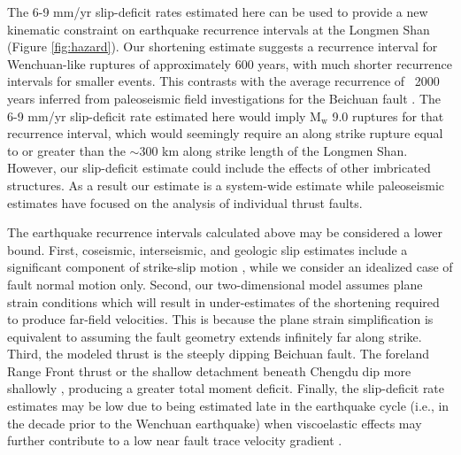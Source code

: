 \documentclass[12pt]{article}
\begin{document}
The 6-9 mm/yr slip-deficit rates estimated here can be used to provide a new kinematic constraint on earthquake recurrence intervals at the Longmen Shan (Figure \ref{fig:hazard}). Our shortening estimate suggests a recurrence interval for Wenchuan-like ruptures of approximately 600 years, with much shorter recurrence intervals for smaller events. This contrasts with the average recurrence of ~2000 years inferred from paleoseismic field investigations for the Beichuan fault \citep{Ran2010}. The 6-9 mm/yr slip-deficit rate estimated here would imply $\textrm{M}_{\textrm{w}}$ 9.0 ruptures for that recurrence interval, which would seemingly require an along strike rupture equal to or greater than the ${\sim}300$ km along strike length of the Longmen Shan. However, our slip-deficit estimate could include the effects of other imbricated structures. As a result our estimate is a system-wide estimate while paleoseismic estimates have focused on the analysis of individual thrust faults. 


The earthquake recurrence intervals calculated above may be considered a lower bound. First, coseismic, interseismic, and geologic slip estimates include a significant component of strike-slip motion \citep{Shen2009a, Qi2011, Densmore2007, Meade2007, Loveless2011}, while we consider an idealized case of fault normal motion only. Second, our two-dimensional model assumes plane strain conditions which will result in under-estimates of the shortening required to produce far-field velocities. This is because the plane strain simplification is equivalent to assuming the fault geometry extends infinitely far along strike. Third, the modeled thrust is the steeply dipping Beichuan fault. The foreland Range Front thrust or the shallow detachment beneath Chengdu dip more shallowly \citep{Hubbard2010}, producing a greater total moment deficit. Finally, the slip-deficit rate estimates may be low due to being estimated late in the earthquake cycle (i.e., in the decade prior to the Wenchuan earthquake) when viscoelastic effects may further contribute to a low near fault trace velocity gradient \citep{savage00}.
\end{document}
